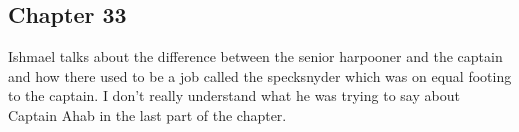 \subsection{Chapter 33}

Ishmael talks about the difference between the senior harpooner and the captain
and how there used to be a job called the specksnyder which was on equal
footing to the captain. I don't really understand what he was trying to say
about Captain Ahab in the last part of the chapter.
